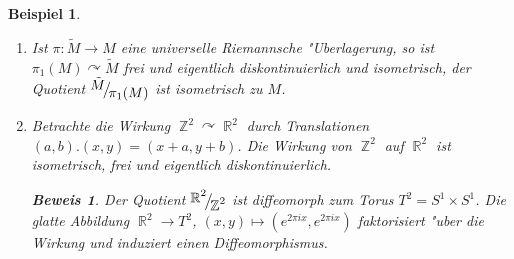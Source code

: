 \documentclass[paper=A4, twoside, chapterprefix=true, bibliography=totoc, headsepline]{scrbook}
\newcommand{\tikzgitter}[3][0.25]{ %
	\draw[step=#1,gray!15] #2 grid #3;
	\draw[step=2*#1,gray!30] #2 grid #3;
	\fill (0,0) circle(0.1); 
}
\DeclareMathOperator{\R}{\mathbb{R}}
\DeclareMathOperator{\Z}{\mathbb{Z}}
\newcommand{\X}{\times}
\newcommand{\FakRaum}[2]{
	\raisebox{0.7ex}{\ensuremath{#1}}
	\ensuremath{\mkern-3mu}\big/\ensuremath{\mkern-3mu}
	\raisebox{-0.6ex}{\ensuremath{#2}}}
\theoremstyle{plain}
\newtheorem{Bsp}[Dfn]{Beispiel}
\theoremstyle{nonumberplain}
\newtheorem{bew}{Beweis}
\theoremstyle{empty}
\theoremstyle{break}
\begin{document}
\begin{Bsp}
  \begin{enumerate}[label=(\arabic*),leftmargin=*]
  \item Ist $\pi: \tilde M \to M$ eine universelle Riemannsche "Uberlagerung, so ist $\pi_1(M) \curvearrowright \tilde M$ frei und eigentlich diskontinuierlich und isometrisch, der Quotient $\FakRaum{\tilde M}{\pi_1(M)}$ ist isometrisch zu $M$.
  \item Betrachte die Wirkung $\Z^2 \curvearrowright \R^2$ durch Translationen $(a,b).(x,y) = (x+a, y+b)$. Die Wirkung von $\Z^2$ auf $\R^2$ ist isometrisch, frei und eigentlich diskontinuierlich.
    \begin{bew}
      Der Quotient $\FakRaum{\R^2}{\Z^2}$ ist diffeomorph zum Torus $T^2 = S^1 \X S^1$.
      Die glatte Abbildung $\R^2 \to T^2$, $(x,y) \mapsto (e^{2 \pi i x}, e^{2 \pi i x})$ faktorisiert "uber die Wirkung und induziert einen Diffeomorphismus.
      \begin{center}
\end{center}
\end{bew}
\end{enumerate}
\end{Bsp}
\end{document}
